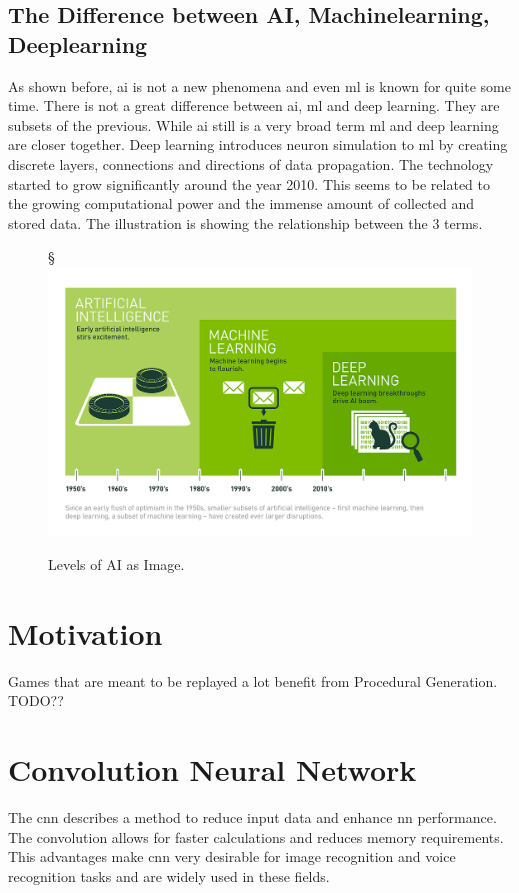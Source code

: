 \documentclass[10pt,a4paper]{article}
\begin{document}
\subsection{The Difference between AI, Machinelearning, Deeplearning}
\label{sec:AIMachinelearningDeeplearning}
As shown before, \gls{ai} is not a new phenomena and even \gls{ml} is known for quite some time. There is not a great difference between \gls{ai}, \gls{ml} and deep learning. They are subsets of the previous. While \gls{ai} still is a very broad term \gls{ml} and deep learning are closer together. Deep learning introduces neuron simulation to \gls{ml} by creating discrete layers, connections and directions of data propagation\cite{MichaelCopeland2016}. The technology started to grow significantly around the year 2010. This seems to be related to the growing computational power and the immense amount of collected and stored data\cite{MichaelCopeland2016}. The illustration is showing the relationship between the 3 terms.
\begin{figure}[H]§
	\includegraphics[width=\textwidth, height=\textheight, keepaspectratio]{Deep_Learning_Icons_R5.png}
	\caption{Levels of AI as Image\cite{MichaelCopeland2016}.}
\end{figure}

\section{Motivation}
Games that are meant to be replayed a lot benefit from Procedural Generation.
TODO??

\section{Convolution Neural Network}
The \gls{cnn} describes a method to reduce input data and enhance \gls{nn} performance. The convolution allows for faster calculations and reduces memory requirements. This advantages make \gls{cnn} very desirable for image recognition and voice recognition tasks and are widely used in these fields.
\end{document}

